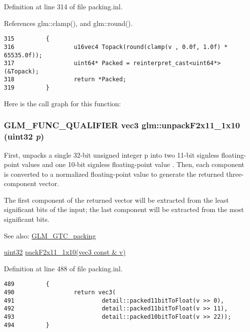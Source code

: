 Definition at line 314 of file packing.inl.

References glm::clamp(), and glm::round().

\begin{Code}\begin{verbatim}315         {
316                 u16vec4 Topack(round(clamp(v , 0.0f, 1.0f) * 65535.0f));
317                 uint64* Packed = reinterpret_cast<uint64*>(&Topack);
318                 return *Packed;
319         }
\end{verbatim}
\end{Code}




Here is the call graph for this function:\hypertarget{group__gtc__packing_g8b9c7991eb021d95c778bf5c0b2f7824}{
\subsubsection[unpackF2x11\_\-1x10]{\setlength{\rightskip}{0pt plus 5cm}GLM\_\-FUNC\_\-QUALIFIER vec3 glm::unpackF2x11\_\-1x10 (uint32 {\em p})}}
\label{group__gtc__packing_g8b9c7991eb021d95c778bf5c0b2f7824}


First, unpacks a single 32-bit unsigned integer p into two 11-bit signless floating-point values and one 10-bit signless floating-point value . Then, each component is converted to a normalized floating-point value to generate the returned three-component vector.

The first component of the returned vector will be extracted from the least significant bits of the input; the last component will be extracted from the most significant bits.

\begin{Desc}
\item[See also:]\hyperlink{group__gtc__packing}{GLM\_\-GTC\_\-packing} 

\hyperlink{group__gtc__type__precision_g202b6a53c105fcb7e531f9b443518451}{uint32} \hyperlink{group__gtc__packing_g8c2a0eeee677ca4dafd9e093d9e81062}{packF2x11\_\-1x10(vec3 const \& v)} \end{Desc}


Definition at line 488 of file packing.inl.

\begin{Code}\begin{verbatim}489         {
490                 return vec3(
491                         detail::packed11bitToFloat(v >> 0), 
492                         detail::packed11bitToFloat(v >> 11), 
493                         detail::packed10bitToFloat(v >> 22));
494         }
\end{verbatim}
\end{Code}



